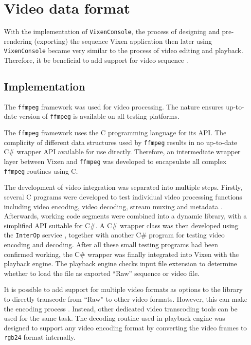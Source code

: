 \section{Video data format}

With the implementation of \texttt{VixenConsole}, the process of designing and pre-rendering (exporting) the sequence  Vixen application then  later using \texttt{VixenConsole} became very similar to the process of video editing and playback. Therefore, it  be beneficial to add support for video sequence .

\subsection{Implementation}

The  \texttt{ffmpeg} framework \cite{ffmpeg} was used for video processing. The  nature ensures  up-to-date version of \texttt{ffmpeg} is available on all testing platforms.

The \texttt{ffmpeg} framework uses the C programming language for its API. The complicity of different data structures used by \texttt{ffmpeg} results in no up-to-date C\# wrapper API available for use directly. Therefore, an intermediate wrapper layer between Vixen and \texttt{ffmpeg} was developed to encapsulate all complex \texttt{ffmpeg} routines using C.

The development of video integration was separated into multiple steps. Firstly, several C programs were developed to test individual video processing functions including video encoding, video decoding, stream muxing and metadata . Afterwards, working code segments were combined into a dynamic library, with a simplified API suitable for C\#. A C\# wrapper class was then developed using the \texttt{InterOp} service \cite{interop}, together with another C\# program for testing video encoding and decoding. After all these small testing programs had been confirmed  working, the C\# wrapper was finally integrated into Vixen with the playback engine. The playback engine checks  input file extension to determine whether to load the file as  exported ``Raw'' sequence or  video file.

 It is possible to add support for multiple video formats as options to the  library to directly transcode from ``Raw''  to other video  formats. However, this can make the encoding process  . Instead, other dedicated video transcoding tools can be used for the same task. The decoding routine used in  playback engine was designed to support any video encoding format by converting the video frames to \texttt{rgb24} format internally.

